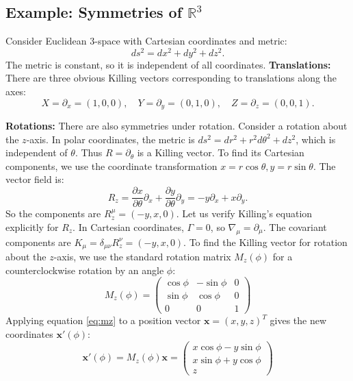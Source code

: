 \documentclass[11pt, a4paper]{report}
\begin{document}
\subsection*{Example: Symmetries of \(\mathbb{R}^3\)}
Consider Euclidean 3-space with Cartesian coordinates and metric:
\begin{equation}
ds^2 = dx^2 + dy^2 + dz^2.
\end{equation}
The metric is constant, so it is independent of all coordinates.
\textbf{Translations:}
There are three obvious Killing vectors corresponding to translations along the axes:
\begin{equation}
X = \partial_x = (1, 0, 0), \quad Y = \partial_y = (0, 1, 0), \quad Z = \partial_z = (0, 0, 1).
\end{equation}

\textbf{Rotations:}
There are also symmetries under rotation. Consider a rotation about the \(z\)-axis. In polar coordinates, the metric is \(ds^2 = dr^2 + r^2 d\theta^2 + dz^2\), which is independent of \(\theta\). Thus \(R = \partial_\theta\) is a Killing vector.
To find its Cartesian components, we use the coordinate transformation \(x = r \cos\theta, y = r \sin\theta\). The vector field is:
\begin{equation}
R_z = \frac{\partial x}{\partial \theta}\partial_x + \frac{\partial y}{\partial \theta}\partial_y = -y \partial_x + x \partial_y.
\end{equation}
So the components are \(R_z^\mu = (-y, x, 0)\).
Let us verify Killing's equation explicitly for \(R_z\). In Cartesian coordinates, \(\Gamma = 0\), so \(\nabla_\mu = \partial_\mu\). The covariant components are \(K_\mu = \delta_{\mu\nu} R_z^\nu = (-y, x, 0)\).
To find the Killing vector for rotation about the $z$-axis, we use the standard rotation matrix $M_z(\phi)$ for a counterclockwise rotation by an angle $\phi$:
\begin{equation} M_z(\phi) = \begin{pmatrix} \cos\phi & -\sin\phi & 0 \\ \sin\phi & \cos\phi & 0 \\ 0 & 0 & 1 \end{pmatrix} \label{eq:mz} \end{equation}
Applying equation \eqref{eq:mz} to a position vector $\mathbf{x} = (x, y, z)^T$ gives the new coordinates $\mathbf{x}'(\phi)$:
\begin{equation} \mathbf{x}'(\phi) = M_z(\phi) \mathbf{x} = \begin{pmatrix} x\cos\phi - y\sin\phi \\ x\sin\phi + y\cos\phi \\ z \end{pmatrix} \label{eq:x_prime_z} \end{equation}
\end{document}
